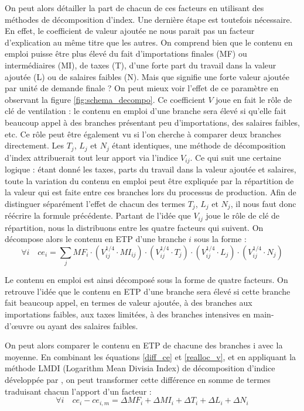 On peut alors détailler la part de chacun de ces facteurs en utilisant des méthodes de décomposition d’index. Une dernière étape est toutefois nécessaire. En effet, le coefficient de valeur ajoutée ne nous parait pas un facteur d’explication au même titre que les autres. On comprend bien que le contenu en emploi puisse être plus élevé du fait d’importations finales (MF) ou intermédiaires (MI), de taxes (T), d’une forte part du travail dans la valeur ajoutée (L) ou de salaires faibles (N). Mais que signifie une forte valeur ajoutée par unité de demande finale ? On peut mieux voir l’effet de ce paramètre en observant la figure \ref{fig:schema_decompo}. 
Ce coefficient $V$ joue en fait le rôle de clé de ventilation : le contenu en emploi d’une branche sera élevé si qu’elle fait beaucoup appel à des branches présentant peu d’importations, des salaires faibles, etc.
Ce rôle peut être également vu si l’on cherche à comparer deux branches directement. Les $T_j$, $L_j$ et $N_j$ étant identiques, une méthode de décomposition d’index attribuerait tout leur apport via l’indice $V_{ij}$. Ce qui suit une certaine logique : étant donné les taxes, parts du travail dans la valeur ajoutée et salaires, toute la variation du contenu en emploi peut être expliquée par la répartition de la valeur qui est faite entre ces branches lors du processus de production. Afin de distinguer séparément l’effet de chacun des termes $T_j$, $L_j$ et $N_j$, il nous faut donc réécrire la formule précédente. Partant de l’idée que $V_{ij}$ joue le rôle de clé de répartition, nous la distribuons entre les quatre facteurs qui suivent. On décompose alors le contenu en ETP d’une branche $i$ sous la forme :
\begin{equation}
\forall i \quad ce_i = \sum_j MF_i \cdot (V_{ij}^{1/4} \cdot MI_{ij}) \cdot (V_{ij}^{1/4} \cdot T_j) \cdot (V_{ij}^{1/4} \cdot L_j) \cdot (V_{ij}^{1/4} \cdot N_j)
\label{realloc_v}
\end{equation}

Le contenu en emploi est ainsi décomposé sous la forme de quatre facteurs. On retrouve l’idée que le contenu en ETP d’une branche sera élevé si cette branche fait beaucoup appel, en termes de valeur ajoutée, à des branches aux importations faibles, aux taxes limitées, à des branches intensives en main-d’œuvre ou ayant des salaires faibles.

On peut alors comparer le contenu en ETP de chacune des branches i avec la moyenne. En combinant les équations \ref{diff_ce} et \ref{realloc_v}, et en appliquant la méthode LMDI (Logarithm Mean Divisia Index) de décomposition d’indice développée par \citet{Ang2005}, on peut transformer cette différence en somme de termes traduisant chacun l’apport d'un facteur :
\begin{equation}
\forall i \quad ce_i - ce_{i,m} = \Delta MF_i + \Delta MI_i + \Delta T_i +\Delta L_i + \Delta N_i
\end{equation}

